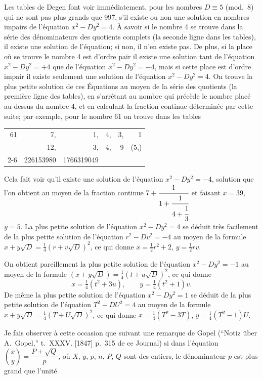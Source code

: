 \documentclass[11pt,a4paper]{book}
\begin{document}
Les tables de Degen font voir imm\'{e}diatement, pour les nombres $D\equiv5$ (mod.~8) qui ne sont pas plus grands que 997, s'il existe ou non une solution en nombres impairs de l'\'{e}quation $x^2-Dy^2=4$. \`{A} savoir si le nombre 4 se trouve dans la s\'{e}rie des d\'{e}nominateurs des quotients complets (la seconde ligne dans les tables), il existe une solution de l'\'{e}quation; si non, il n'en existe pas. De plus, si la place o\`{u} se trouve le nombre 4 est d'ordre pair il existe une solution tant de l'\'{e}quation $x^2-Dy^2=+4$ que de l'\'{e}quation $x^2-Dy^2=-4$, mais si cette place est d'ordre impair il existe seulement une solution de l'\'{e}quation $x^2-Dy^2=4$. On trouve la plus petite solution de ces \'{E}quations au moyen de la s\'{e}rie des quotients (la premi\`{e}re ligne des tables), en s'arr\^{e}tant au nombre qui pr\'{e}c\`{e}de le nombre plac\'{e} au-dessus du nombre 4, et en calculant la fraction continue d\'{e}termin\'{e}e par cette suite; par exemple, pour le nombre 61 on trouve dans les tables
\begin{center}
\begin{tabular}{r|rrrrr}
61 & 7, & 1, & 4, & 3, & 1\\
& 12, & 3, & 4, & 9 & (5,\;5)\\
\cline{2-6}
& 226153980 & 1766319049 & \multicolumn{3}{c}{}
\end{tabular}
\end{center}
Cela fait voir qu'il existe une solution de l'\'{e}quation $x^2-Dy^2=-4$, solution que l'on obtient au moyen de la fraction continue $7+\cfrac{1}{1+\cfrac{1}{4+\cfrac{1}{3}}}$ et faisant $x=39$, $y=5$. La plus petite solution de l'\'{e}quation $x^2-Dy^2=4$ se d\'{e}duit tr\`{e}s facilement de la plus petite solution de l'\'{e}quation $r^2-Dv^2=-4$ au moyen de la formule $x+y\sqrt{D}=\tfrac{1}{4}(r+v\sqrt{D})^2$, ce qui donne $x=\tfrac{1}{2}r^2+2$, $y=\tfrac{1}{2}rv$.

On obtient pareillement la plus petite solution de l'\'{e}quation $x^2-Dy^2=-1$ au moyen de la formule $(x+y\sqrt{D})=\tfrac{1}{4}(t+u\sqrt{D})^2$, ce qui donne
\[
x=\tfrac{1}{4}(t^2+3u),\qquad y=\tfrac{1}{4}(t^2+1)v.
\]
De m\^{e}me la plus petite solution de l'\'{e}quation $x^2-Dy^2=1$ se d\'{e}duit de la plus petite solution de l'\'{e}quation $T^2-DU^2=4$ au moyen de la formule $x+y\sqrt{D}=\tfrac{1}{4}(T+U\sqrt{D})^2$, ce qui donne $x=\tfrac{1}{4}(T^2-3T)$, $y=\tfrac{1}{4}(T^2-1)U$.

Je fais observer \`{a} cette occasion que suivant une remarque de Gopel (``Notiz \"{u}ber A.~Gopel,'' t.~XXXV. [1847] p.~315 de ce Journal) si dans l'\'{e}quation $\left(\dfrac{x}{y}\right)=\dfrac{P+\sqrt{Q}}{p}$, o\`{u} $X$, $y$, $p$, $n$, $P$, $Q$ sont des entiers, le d\'{e}nominateur $p$ est plus grand que l'unit\'{e}
\end{document}
